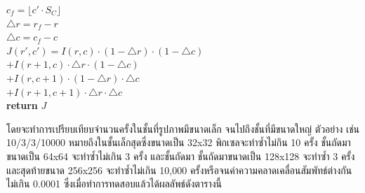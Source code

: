 \documentclass[hidelinks, a4paper,12pt]{article}
\numberwithin{equation}{section}							%
\numberwithin{equation}{section}
\begin{document}
{\begin{algorithm}[H]
{			$c_f = \lfloor c' \cdot S_C \rfloor $\\
			$\triangle r = r_f - r$ \\
			$\triangle c = c_f - c$ \\
			$J(r',c') = I(r,c)\cdot(1-\triangle r)\cdot (1-\triangle c) $\\$+ I(r+1,c) \cdot \triangle r \cdot (1 - \triangle c) $\\$+I(r,c+1)\cdot(1-\triangle r)\cdot\triangle c$\\$+ I(r+1,c+1)\cdot\triangle r \cdot \triangle c$ \\
			\textbf{return} $ J $ 
		}
	\end{algorithm}
	\clearpage
	\hspace{1cm} โดยจะทำการเปรียบเทียบจำนวนครั้งในชั้นที่รูปภาพมีขนาดเล็ก จนไปถึงชั้นที่มีขนาดใหญ่ ตัวอย่าง เช่น 10/3/3/10000 หมายถึงในชั้นเล็กสุดซึ่งขนาดเป็น 32x32 พิกเซลจะทำซ้ำไม่กิน 10 ครั้ง ชั้นถัดมาขนาดเป็น 64x64 จะทำซ้ำไม่เกิน 3 ครั้ง และชั้นถัดมา ชั้นถัดมาขนาดเป็น 128x128 จะทำซ้ำ 3 ครั้ง และสุดท้ายขนาด 256x256 จะทำซ้ำไม่เกิน 10,000 ครั้งหรือจนค่าความคลาดเคลื่อนสัมพัทธ์ต่างกันไม่เกิน 0.0001 ซึ่งเมื่อทำการทดสอบแล้วได้ผลลัพธ์ดังตารางนี้
	
}
\end{document}
